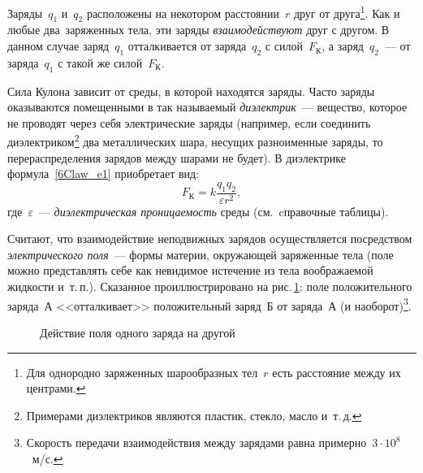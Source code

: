 \documentclass[main.tex]{subfiles}
\begin{document}
Заряды~$q_1$ и~$q_2$ расположены на некотором расстоянии~$r$ друг от друга\footnote{Для однородно заряженных шарообразных тел~$r$ есть расстояние между их центрами.}. Как и любые два~заряженных тела, эти заряды \emph{взаимодействуют} друг с другом. В данном случае заряд~$q_1$ отталкивается от заряда~$q_2$ с силой~$F_\text{К}$, а заряд~$q_2$~--- от заряда~$q_1$ с такой же силой~$F_\text{К}$. 

Сила Кулона зависит от среды, в которой находятся заряды. Часто заряды оказываются помещенными в так называемый \emph{диэлектрик}~--- вещество, которое не проводят через себя электрические заряды (например, если соединить диэлектриком\footnote{Примерами диэлектриков являются пластик, стекло, масло и~т.\,д.} два металлических шара, несущих разноименные заряды, то перераспределения зарядов между шарами не будет). В диэлектрике формула~\eqref{6Claw_e1} приобретает вид:
\begin{equation*}
    F_\text{К}=k\dfrac{q_1q_2}{\varepsilon r^2},
\end{equation*}
где~$\varepsilon$~--- \emph{диэлектрическая проницаемость} среды (см.~cправочные таблицы). 

Считают, что взаимодействие неподвижных зарядов осуществляется посредством \emph{электрического поля}~--- формы материи, окружающей заряженные тела (поле можно представлять себе как невидимое истечение из тела воображаемой жидкости и~т.\,п.). Сказанное проиллюстрировано на рис.\,\ref{fig:p97}: поле положительного заряда~А <<отталкивает>> положительный заряд~Б от заряда~А (и наоборот)\footnote{Скорость передачи взаимодействия между зарядами равна примерно~$3\cdot10^8$~м/с.}. 


\tikzfading[name=fade out,
inner color=transparent!0,
outer color=transparent!100]

    \begin{figure}[H]
    \centering

\caption{Действие поля одного заряда на другой}
\label{fig:p97}
\end{figure}


















 
\end{document}
